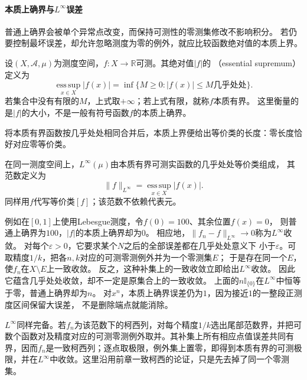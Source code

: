 \paragraph{本质上确界与$L^\infty$误差}

普通上确界会被单个异常点改变，而保持可测性的零测集修改不影响积分。
若仍要控制最坏误差，却允许忽略测度为零的例外，就应比较函数绝对值的本质上界。
\begin{definition}[本质有界与绝对值的本质上界]
\label{def:analysis-essential-bound}
设$(X,\mathcal A,\mu)$为测度空间，$f:X\to\mathbb R$可测。其绝对值$|f|$的
（essential supremum）定义为
\[   \operatorname*{ess\,sup}_{x\in X}|f(x)|   =   \inf\{M\geq0:|f(x)|\leq M\text{几乎处处}\}. \]
若集合中没有有限的$M$，上式取$+\infty$；若上式有限，就称$f$本质有界。
这里衡量的是$|f|$的大小，不是一般有符号函数$f$的本质上确界。
\end{definition}

将本质有界函数按几乎处处相同合并后，本质上界便给出等价类的长度：零长度恰好对应零等价类。
\begin{definition}
\label{def:analysis-linfty-space}
在同一测度空间上，$L^\infty(\mu)$由本质有界可测实函数的几乎处处等价类组成，
其范数定义为
\begin{equation}
  \lVert f\rVert_{L^\infty}
  =
  \operatorname*{ess\,sup}_{x\in X}|f(x)|.
\label{eq:analysis-essential-supremum-norm}
\end{equation}
同样用$f$代写等价类$[f]$；该范数不依赖代表元。
\end{definition}
例如在$[0,1]$上使用Lebesgue测度，令$f(0)=100$、其余位置$f(x)=0$，
则普通上确界为$100$，$|f|$的本质上确界却为$0$。
相应地，$\lVert f_n-f\rVert_{L^\infty}\to0$称为$L^\infty$收敛。
对每个$\varepsilon>0$，它要求某个$N$之后的全部误差都在几乎处处意义下
小于$\varepsilon$。可取精度$1/k$，把各$n,k$对应的可测零测例外并为一个零测集$E$；
于是存在同一个$E$，使$f_n$在$X\setminus E$上一致收敛。
反之，这种补集上的一致收敛立即给出$L^\infty$收敛。
因此它蕴含几乎处处收敛，却不一定是原集合上的一致收敛。
上面的$n\mathbb I_{\{0\}}$在$L^\infty$中恒等于零，普通上确界却为$n$。
对$x^n$，本质上确界误差仍为$1$，因为接近$1$的一整段正测度区间保留大误差，
不是删除端点就能消除。

$L^\infty$同样完备。若$f_n$为该范数下的柯西列，对每个精度$1/k$选出尾部范数界，并把可数个函数对及精度对应的可测零测例外取并。其补集上所有相应点值误差共同有界，因而$f_n$是一致柯西列；逐点取极限，例外集上置零，即得到本质有界的可测极限，并在$L^\infty$中收敛。这里沿用前章一致柯西的论证，只是先去掉了同一个零测集。

